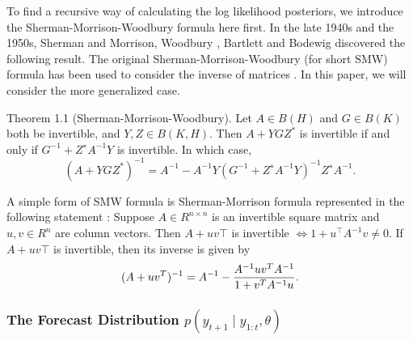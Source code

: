To find a recursive way of calculating the log likelihood posteriors, we introduce the Sherman-Morrison-Woodbury formula here first. In the late 1940s and the 1950s, Sherman and Morrison\cite{sherman1950adjustment}, Woodbury \cite{woodbury1950inverting}, Bartlett \cite{bartlett1951inverse} and Bodewig \cite{bodewig1959matrix} discovered the following result. The original Sherman-Morrison-Woodbury (for short SMW) formula has been used to consider the inverse of matrices \cite{deng2011generalization}. In this paper, we will consider the more generalized case. 

Theorem 1.1 (Sherman-Morrison-Woodbury). Let $A \in B(H)$ and $G \in B(K)$ both be invertible, and $Y, Z \in B(K, H)$. Then $A + YGZ^*$ is invertible if and only if $G^{-1} + Z^∗A^{-1}Y$ is invertible. In which case,
\begin{equation}
(A+YGZ^*)^{-1}= A^{-1}-A^{-1}Y(G^{-1}+Z^∗A^{-1}Y)^{-1}Z^∗A^{-1}.
\end{equation}


A simple form of SMW formula is Sherman-Morrison formula represented in the following statement \cite{bartlett1951inverse}:
Suppose $A\in R^{n\times n}$ is an invertible square matrix and $u,v\in R^n$ are column vectors. Then $A+uv\top$ is invertible $\iff 1+u^\top A^{-1}v\neq 0$. If $A+uv\top$ is invertible, then its inverse is given by
\begin{equation}
(A+uv^{T})^{-1}=A^{-1}-{A^{-1}uv^{T}A^{-1} \over 1+v^{T}A^{-1}u}.
\end{equation}



\subsubsection{The Forecast Distribution $p(y_{t+1}\mid y_{1:t},\theta)$}

